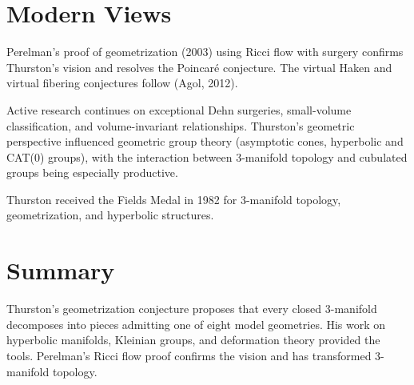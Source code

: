 \section*{Modern Views}

Perelman's proof of geometrization (2003) using Ricci flow with surgery
confirms Thurston's vision and resolves the Poincar\'{e} conjecture. The
virtual Haken and virtual fibering conjectures follow (Agol, 2012).

Active research continues on exceptional Dehn surgeries, small-volume
classification, and volume-invariant relationships. Thurston's geometric
perspective influenced geometric group theory (asymptotic cones,
hyperbolic and CAT(0) groups), with the interaction between 3-manifold
topology and cubulated groups being especially productive.

Thurston received the Fields Medal in 1982 for 3-manifold topology,
geometrization, and hyperbolic structures.

\section*{Summary}
Thurston's geometrization conjecture proposes that every closed 3-manifold
decomposes into pieces admitting one of eight model geometries. His work
on hyperbolic manifolds, Kleinian groups, and deformation theory provided
the tools. Perelman's Ricci flow proof confirms the vision and has
transformed 3-manifold topology.

